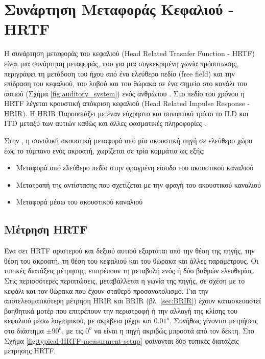 \section{Συνάρτηση Μεταφοράς Κεφαλιού - HRTF} \label{sec:HRTF}


Η συνάρτηση μεταφοράς του κεφαλιού (Head Related Trasnfer Function - HRTF) είναι μια συνάρτηση μεταφοράς, που για μια συγκεκριμένη γωνία πρόσπτωσης, περιγράφει τη μετάδοση του ήχου από ένα ελεύθερο πεδίο (free field) και την επίδραση του κεφαλιού, του λοβού και του θώρακα σε ένα σημείο στο κανάλι του αυτιού (Σχήμα \ref{fig:auditory_system}) ενός ανθρώπου \cite{mller1995head}. Στο πεδίο του χρόνου η HRTF λέγεται κρουστική απόκριση κεφαλιού (Head Related Impulse Response - HRIR). Η HRIR Παρουσιάζει με έναν εύχρηστο και συνοπτικό τρόπο το ILD και ITD μεταξύ των αυτιών καθώς και άλλες φασματικές πληροφορίες \cite{Enzner2013}.

Στην \cite{doi:10.1121/1.415856}, η συνολική ακουστική μεταφορά από μία ακουστική πηγή σε ελεύθερο χώρο έως το τύμπανο ενός ακροατή, χωρίζεται σε τρία κομμάτια ως εξής:

\begin{itemize}
    \item Μεταφορά από ελεύθερο πεδίο στην φραγμένη είσοδο του ακουστικού καναλιού
    \item Μετατροπή της αντίστασης που σχετίζεται με την φραγή του ακουστικού καναλιού
    \item Μεταφορά μέσω του ακουστικού καναλιού
\end{itemize}{}

\subsection{Μέτρηση HRTF}

Ένα σετ HRTF αριστερού και δεξιού αυτιού εξαρτάται από την θέση της πηγής, την θέση του ακροατή, τη θέση του κεφαλιού και του θώρακα και άλλες παραμέτρους. Οι τυπικές διατάξεις μέτρησης, επιτρέπουν τη μεταβολή ενός ή δύο βαθμών ελευθερίας. Στις περισσότερες περιπτώσεις, μεταβάλλεται η γωνία της πηγής, σε σχέση με το κεφάλι και τον θώρακα που έχουν σταθερό προσανατολισμό. Για την αποτελεσματικότερη μέτρηση HRIR και BRIR (βλ. \ref{sec:BRIR}) έχουν κατασκευαστεί βοηθητικά μοτέρ που επιτρέπουν την περιστροφή ή την αλλαγή της κλίσης του κεφαλιού μέσω λογισμικού, με ακρίβεια μέχρι και $0.01^o$. Συνήθως γίνονται μετρήσεις στο διάστημα $\pm90^o$, με τις $0^ο$ να είναι η πηγή ακριβώς μπροστά από τον δέκτη. Στο Σχήμα \ref{fig:typical-HRTF-measurment-setup} φαίνονται δύο τυπικές διατάξεις μέτρησης HRTF. 

